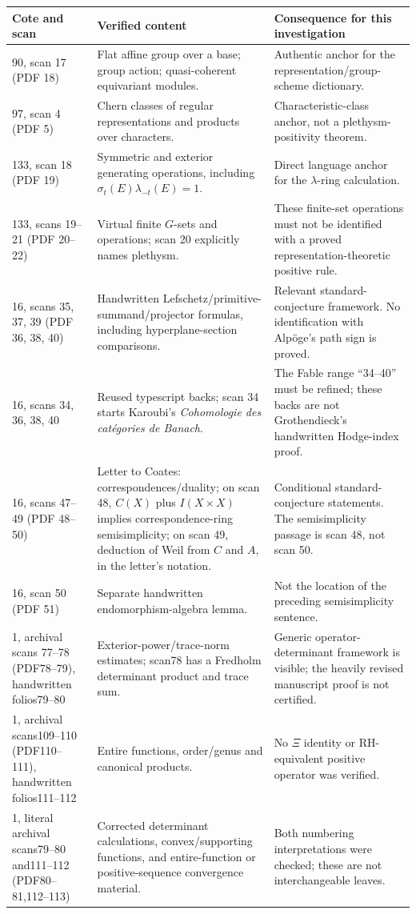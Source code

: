 {\small\begin{longtable}{p{.19\linewidth}p{.36\linewidth}p{.37\linewidth}}
\toprule Cote and scan&Verified content&Consequence for this investigation\\\midrule\endhead
90, scan 17 (PDF 18)&Flat affine group over a base; group action; quasi-coherent equivariant modules.&Authentic anchor for the representation/group-scheme dictionary.\\
97, scan 4 (PDF 5)&Chern classes of regular representations and products over characters.&Characteristic-class anchor, not a plethysm-positivity theorem.\\
133, scan 18 (PDF 19)&Symmetric and exterior generating operations, including $\sigma_t(E)\lambda_{-t}(E)=1$.&Direct language anchor for the $\lambda$-ring calculation.\\
133, scans 19--21 (PDF 20--22)&Virtual finite $G$-sets and operations; scan 20 explicitly names plethysm.&These finite-set operations must not be identified with a proved representation-theoretic positive rule.\\
16, scans 35, 37, 39 (PDF 36, 38, 40)&Handwritten Lefschetz/primitive-summand/projector formulas, including hyperplane-section comparisons.&Relevant standard-conjecture framework. No identification with Alp\"oge's path sign is proved.\\
16, scans 34, 36, 38, 40&Reused typescript backs; scan 34 starts Karoubi's \emph{Cohomologie des cat\'egories de Banach}.&The Fable range ``34--40'' must be refined; these backs are not Grothendieck's handwritten Hodge-index proof.\\
16, scans 47--49 (PDF 48--50)&Letter to Coates: correspondences/duality; on scan 48, $C(X)$ plus $I(X\times X)$ implies correspondence-ring semisimplicity; on scan 49, deduction of Weil from $C$ and $A$, in the letter's notation.&Conditional standard-conjecture statements. The semisimplicity passage is scan 48, not scan 50.\\
16, scan 50 (PDF 51)&Separate handwritten endomorphism-algebra lemma.&Not the location of the preceding semisimplicity sentence.\\
1, archival scans 77--78 (PDF78--79), handwritten folios79--80&Exterior-power/trace-norm estimates; scan78 has a Fredholm determinant product and trace sum.&Generic operator-determinant framework is visible; the heavily revised manuscript proof is not certified.\\
1, archival scans109--110 (PDF110--111), handwritten folios111--112&Entire functions, order/genus and canonical products.&No $\Xi$ identity or RH-equivalent positive operator was verified.\\
1, literal archival scans79--80 and111--112 (PDF80--81,112--113)&Corrected determinant calculations, convex/supporting functions, and entire-function or positive-sequence convergence material.&Both numbering interpretations were checked; these are not interchangeable leaves.\\\bottomrule
\end{longtable}}
